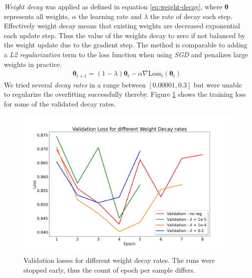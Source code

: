 \textit{Weight decay} was applied as defined in equation \ref{eq:weight-decay}, where $\boldsymbol{\theta}$ represents all weights, $\alpha$ the learning rate and $\lambda$ the rate of decay each step. Effectively weight decay means that existing weights are decreased exponential each update step. Thus the value of the weights decay to zero if not balanced by the weight update due to the gradient step. The method is comparable to adding a \textit{L2 regularization} term to the loss function when using \textit{SGD} \autocite{loshchilov2017decoupled} and penalizes large weights in practice.
\begin{align}\label{eq:weight-decay}
	\boldsymbol{\theta}_{t+1} = \left( 1 - \lambda \right) \boldsymbol{\theta}_{t} - \alpha \nabla \text{Loss}_t \left( \boldsymbol{\theta}_{t} \right)
\end{align}
We tried several \textit{decay rates} in a range between $[0.00001, 0.3]$ but were unable to regularize the overfitting successfully thereby. Figure \ref{fig:weight-decay} shows the training loss for some of the validated decay rates.

\begin{figure}
	\centering
	\includegraphics[width=.7\linewidth]{img/reg_study_weight_decay.png}
	\caption{Validation losses for different weight decay rates. The runs were stopped early, thus the count of epoch per sample differs.}
	\label{fig:weight-decay}
\end{figure}

